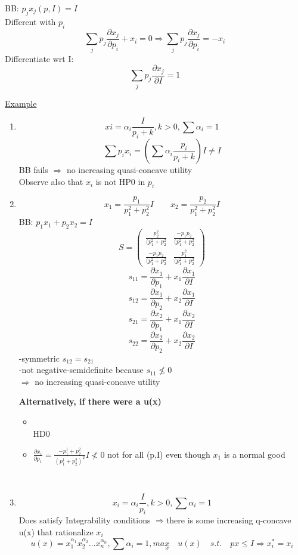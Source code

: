 \documentclass[letterpaper,13pt,single,pdftex]{scrartcl}
\begin{document}
BB: $p_jx_j(p,I) = I$\\
Different with $p_i$
\[\sum\limits_{j}p_j \frac{\partial x_j}{\partial p_i} + x_i = 0 \Rightarrow \sum\limits_{j}p_j \frac{\partial x_j}{\partial p_i} = -x_i\]
Differentiate wrt I:
\[\sum\limits_{j} p_j \frac{\partial x_j}{\partial I} = 1\]
{\underline{Example}
\begin{enumerate}
    \item %
    \[xi = \alpha_i \frac{I}{p_i+k}, k>0, \sum\alpha_i = 1 \]
    \[\sum p_i x_i = (\sum \alpha_i \frac{p_i}{p_i+k})I \ne I\]
    BB fails $\Rightarrow$ no increasing quasi-concave utility\\ Observe also that $ x_i$ is not HP0 in $p_i$

    \item %
    \[x_1 = \frac{p_1}{p_1^2 + p_2^2} I \qquad x_2 = \frac{p_2}{p_1^2 + p_2^2} I  \]
    BB: $ p_1x_1 +p_2x_2 = I $ 
    \[S = \left( {\begin{array}{*{20}{c}}
    {{\frac{p^2_2}{(p_1^2 + p_2^2}}}&{{\frac{-p_1p_2}{(p_1^2 + p_2^2}}}\\
    {{\frac{-p_1p_2}{(p_1^2 + p_2^2}}}&{{\frac{p_1^2}{(p_1^2 + p_2^2}}}
    \end{array}} \right)\] 
    \[s_{11}= \frac{\partial x_1}{\partial p_1 } +x_1\frac{\partial x_1}{\partial I}\]
    \[s_{12} = \frac{\partial x_1}{\partial p_2 } +x_2\frac{\partial x_1}{\partial I}\]
    \[s_{21} = \frac{\partial x_2}{\partial p_1 } +x_1\frac{\partial x_2}{\partial I}\]
    \[s_{22} = \frac{\partial x_2}{\partial p_2 } +x_2\frac{\partial x_2}{\partial I}\]
    -symmetric $s_{12} = s_{21}$ \\ 
    -not negative-semidefinite because $s_{11} \not\le 0 $\\ 
    $\Rightarrow$ no increasing quasi-concave utility

    \par \textbf{Alternatively, if there were a u(x)}
    \begin{itemize}
        \item   
        \\HD0 
        \item
        $\frac{\partial x_i}{\partial p_1} = \frac{-p_1^1+p_2^2}{(p_1^1 +p_2^2)^2}I \not< 0$ not for all (p,I) even though $x_1$ is a normal good
    \end{itemize}\\
            
    \item %
    \[x_i = \alpha_i \frac{I}{p_i}, k>0, \sum \alpha_i = 1 \]
    Does satisfy Integrability conditions $\Rightarrow $there is some increasing q-concave u(x) that rationalize $x_i$ 
    \[u(x) = x_1^{\alpha_1}x_2^{\alpha_2}\dots x_n^{\alpha_n}, \sum \alpha_i = 1, max\limits_{x}\quad u(x) \quad s.t.\quad px\le I \Rightarrow x_i^* = x_i\]
\end{enumerate}
}
\end{document}
